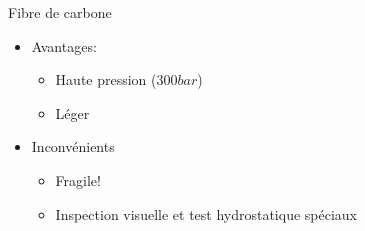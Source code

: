 \documentclass[aspectratio=1610,english,12pt]{beamer}
\begin{document}
\begin{frame}{Fibre de carbone}
	\begin{itemize}
		\item Avantages:
			\begin{itemize}
				\item Haute pression ($300bar$)
				\item Léger
			\end{itemize}
		\item Inconvénients
			\begin{itemize}
				\item Fragile!
				\item Inspection visuelle et test hydrostatique spéciaux
			\end{itemize}
	\end{itemize}
\end{frame}

\end{document}
